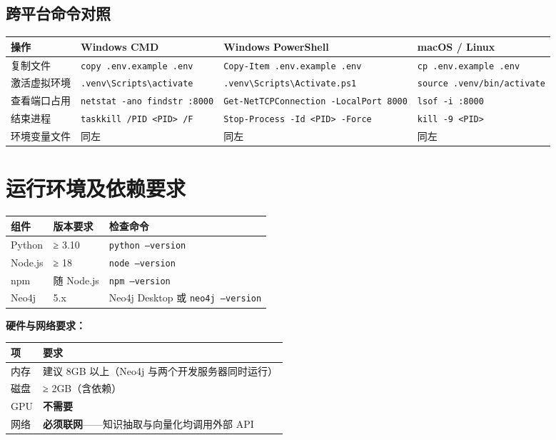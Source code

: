 \documentclass[UTF8,a4paper,11pt]{ctexrep}
\begin{document}
\subsection{跨平台命令对照}

\begin{center}
\small
\begin{tabularx}{\linewidth}{@{}XXXX@{}}
\toprule
操作 & Windows CMD & Windows PowerShell & macOS / Linux \\
\midrule
复制文件 & \texttt{copy .env.example .env} & \texttt{Copy-Item .env.example .env} & \texttt{cp .env.example .env} \\
激活虚拟环境 & \texttt{.venv\textbackslash{}Scripts\textbackslash{}activate} & \texttt{.venv\textbackslash{}Scripts\textbackslash{}Activate.ps1} & \texttt{source .venv/bin/activate} \\
查看端口占用 & \texttt{netstat -ano \textbar{} findstr :8000} & \texttt{Get-NetTCPConnection -LocalPort 8000} & \texttt{lsof -i :8000} \\
结束进程 & \texttt{taskkill /PID <PID> /F} & \texttt{Stop-Process -Id <PID> -Force} & \texttt{kill -9 <PID>} \\
环境变量文件 & 同左 & 同左 & 同左 \\
\bottomrule
\end{tabularx}
\end{center}

\section{运行环境及依赖要求}

\begin{center}
\small
\begin{tabularx}{\linewidth}{@{}XXX@{}}
\toprule
组件 & 版本要求 & 检查命令 \\
\midrule
Python & ≥ 3.10 & \texttt{python --version} \\
Node.js & ≥ 18 & \texttt{node --version} \\
npm & 随 Node.js & \texttt{npm --version} \\
Neo4j & 5.x & Neo4j Desktop 或 \texttt{neo4j --version} \\
\bottomrule
\end{tabularx}
\end{center}
\textbf{硬件与网络要求：}

\begin{center}
\small
\begin{tabularx}{\linewidth}{@{}XX@{}}
\toprule
项 & 要求 \\
\midrule
内存 & 建议 8GB 以上（Neo4j 与两个开发服务器同时运行） \\
磁盘 & ≥ 2GB（含依赖） \\
GPU & \textbf{不需要} \\
网络 & \textbf{必须联网}——知识抽取与向量化均调用外部 API \\
\bottomrule
\end{tabularx}
\end{center}
\end{document}
